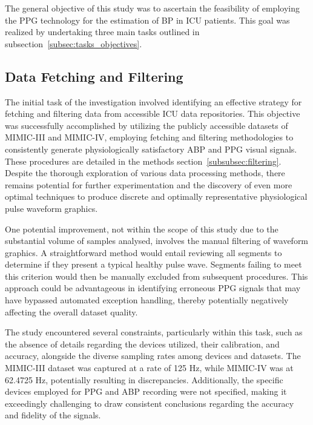 The general objective of this study was to ascertain the feasibility of employing the PPG technology for the estimation of BP in ICU patients.
This goal was realized by undertaking three main tasks outlined in subsection~\ref{subsec:tasks_objectives}.

\subsection{Data Fetching and Filtering}
\label{subsec:data-fetching-and-filtering}

The initial task of the investigation involved identifying an effective strategy for fetching and filtering data from accessible ICU data repositories.
This objective was successfully accomplished by utilizing the publicly accessible datasets of MIMIC-III and MIMIC-IV,
employing fetching and filtering methodologies to consistently generate physiologically satisfactory ABP and PPG visual signals.
These procedures are detailed in the methods section~\ref{subsubsec:filtering}.
Despite the thorough exploration of various data processing methods, there remains potential for further experimentation and the discovery of even more optimal techniques
to produce discrete and optimally representative physiological pulse waveform graphics.

One potential improvement, not within the scope of this study due to the substantial volume of samples analysed, involves the manual filtering of waveform graphics.
A straightforward method would entail reviewing all segments to determine if they present a typical healthy pulse wave.
Segments failing to meet this criterion would then be manually excluded from subsequent procedures.
This approach could be advantageous in identifying erroneous PPG signals that may have bypassed automated exception handling, thereby potentially negatively affecting the overall dataset quality.

The study encountered several constraints, particularly within this task, such as the absence of details regarding the devices utilized,
their calibration, and accuracy, alongside the diverse sampling rates among devices and datasets.
The MIMIC-III dataset was captured at a rate of 125 Hz, while MIMIC-IV was at 62.4725 Hz, potentially resulting in discrepancies.
Additionally, the specific devices employed for PPG and ABP recording were not specified, making it exceedingly challenging to draw consistent conclusions regarding the accuracy and fidelity of the signals.

